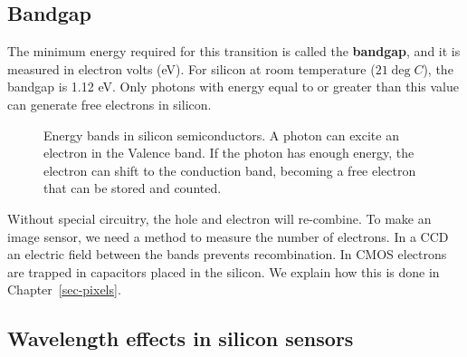 \documentclass[
  letterpaper,
]{book}
\begin{document}
\subsection{Bandgap}\label{sec-bandgap-photon-absorption}

The minimum energy required for this transition is called the
\textbf{bandgap}, and it is measured in electron volts (eV). For silicon
at room temperature (\(21 \deg C\)), the bandgap is 1.12 eV. Only
photons with energy equal to or greater than this value can generate
free electrons in silicon.

\begin{figure}


\caption{\label{fig-sensor-bandgap}Energy bands in silicon
semiconductors. A photon can excite an electron in the Valence band. If
the photon has enough energy, the electron can shift to the conduction
band, becoming a free electron that can be stored and counted.}

\end{figure}%

Without special circuitry, the hole and electron will re-combine. To
make an image sensor, we need a method to measure the number of
electrons. In a CCD an electric field between the bands prevents
recombination. In CMOS electrons are trapped in capacitors placed in the
silicon. We explain how this is done in Chapter~\ref{sec-pixels}.

\subsection{Wavelength effects in silicon
sensors}\label{sec-wavelength-effects}
\end{document}
